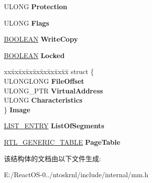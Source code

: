 \begin{DoxyCompactItemize}
\mbox{\label{struct___m_m___s_e_c_t_i_o_n___s_e_g_m_e_n_t_abeab08e5a3bb2692a911b78aff7ddf76}} 
U\+L\+O\+NG {\bfseries Protection}
\item 
\mbox{\label{struct___m_m___s_e_c_t_i_o_n___s_e_g_m_e_n_t_ab527e366da90dbaa3bbcebdc5f319600}} 
U\+L\+O\+NG {\bfseries Flags}
\item 
\mbox{\label{struct___m_m___s_e_c_t_i_o_n___s_e_g_m_e_n_t_abae0ff3f6a18f372334c875c35c07bb8}} 
\hyperlink{_processor_bind_8h_a112e3146cb38b6ee95e64d85842e380a}{B\+O\+O\+L\+E\+AN} {\bfseries Write\+Copy}
\item 
\mbox{\label{struct___m_m___s_e_c_t_i_o_n___s_e_g_m_e_n_t_a8436b320a3b05d632162512815b964c3}} 
\hyperlink{_processor_bind_8h_a112e3146cb38b6ee95e64d85842e380a}{B\+O\+O\+L\+E\+AN} {\bfseries Locked}
\item 
\mbox{\label{struct___m_m___s_e_c_t_i_o_n___s_e_g_m_e_n_t_aa6167e951a0c93114d9838dad38c10eb}} 
\begin{tabbing}
xx\=xx\=xx\=xx\=xx\=xx\=xx\=xx\=xx\=\kill
struct \{\\
\>ULONGLONG {\bfseries FileOffset}\\
\>ULONG\_PTR {\bfseries VirtualAddress}\\
\>ULONG {\bfseries Characteristics}\\
\} {\bfseries Image}\\

\end{tabbing}\item 
\mbox{\label{struct___m_m___s_e_c_t_i_o_n___s_e_g_m_e_n_t_a0f7768e3bd7ef92e2ca7f717d6c433b0}} 
\hyperlink{struct___l_i_s_t___e_n_t_r_y}{L\+I\+S\+T\+\_\+\+E\+N\+T\+RY} {\bfseries List\+Of\+Segments}
\item 
\mbox{\label{struct___m_m___s_e_c_t_i_o_n___s_e_g_m_e_n_t_af22a0f4a4092af0817228236f95d2314}} 
\hyperlink{struct___r_t_l___g_e_n_e_r_i_c___t_a_b_l_e}{R\+T\+L\+\_\+\+G\+E\+N\+E\+R\+I\+C\+\_\+\+T\+A\+B\+LE} {\bfseries Page\+Table}
\end{DoxyCompactItemize}


该结构体的文档由以下文件生成\+:\begin{DoxyCompactItemize}
\item 
E\+:/\+React\+O\+S-\/0../ntoskrnl/include/internal/mm.\+h\end{DoxyCompactItemize}
